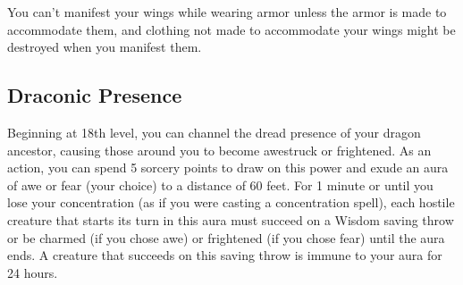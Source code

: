 You can’t manifest your wings while wearing armor unless the armor is made to accommodate them, and clothing not made to accommodate your wings might be destroyed when you manifest them.

\subsection{Draconic Presence}

Beginning at 18th level, you can channel the dread presence of your dragon ancestor, causing those around you to become awestruck or frightened. As an action, you can spend 5 sorcery points to draw on this power and exude an aura of awe or fear (your choice) to a distance of 60 feet. For 1 minute or until you lose your concentration (as if you were casting a concentration spell), each hostile creature that starts its turn in this aura must succeed on a Wisdom saving throw or be charmed (if you chose awe) or frightened (if you chose fear) until the aura ends. A creature that succeeds on this saving throw is immune to your aura for 24 hours.